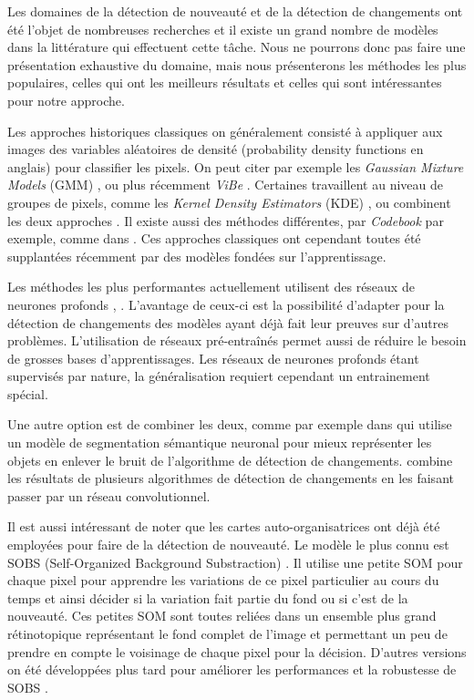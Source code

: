 	Les domaines de la détection de nouveauté et de la détection de changements ont été l'objet de nombreuses recherches et il existe un grand nombre de modèles dans la littérature qui effectuent cette tâche. Nous ne pourrons donc pas faire une présentation exhaustive du domaine, mais nous présenterons les méthodes les plus populaires, celles qui ont les meilleurs résultats et celles qui sont intéressantes pour notre approche.

	Les approches historiques classiques on généralement consisté à appliquer aux images des variables aléatoires de densité (probability density functions en anglais) pour classifier les pixels. On peut citer par exemple les \textit{Gaussian Mixture Models} (GMM) \cite{zivkovic2004improved}, ou plus récemment \textit{ViBe} \cite{barnich2009vibe}. Certaines travaillent au niveau de groupes de pixels, comme les \textit{Kernel Density Estimators} (KDE) \cite{elgammal2000non}, ou combinent les deux approches \cite{toyama1999wallflower}. Il existe aussi des méthodes différentes, par \textit{Codebook} par exemple, comme dans \cite{kim2004background}. Ces approches classiques ont cependant toutes été supplantées récemment par des modèles fondées sur l'apprentissage.

	Les méthodes les plus performantes actuellement utilisent des réseaux de neurones profonds \cite{tezcan2021bsuv}, \cite{bouwmans2019deep}. L'avantage de ceux-ci est la possibilité d'adapter pour la détection de changements des modèles ayant déjà fait leur preuves sur d'autres problèmes. L'utilisation de réseaux pré-entraînés permet aussi de réduire le besoin de grosses bases d'apprentissages. Les réseaux de neurones profonds étant supervisés par nature, la généralisation requiert cependant un entrainement spécial.

	Une autre option est de combiner les deux, comme par exemple dans \cite{braham2017semantic} qui utilise un modèle de segmentation sémantique neuronal pour mieux représenter les objets en enlever le bruit de l'algorithme de détection de changements. \cite{zeng2019combining} combine les résultats de plusieurs algorithmes de détection de changements en les faisant passer par un réseau convolutionnel.

	Il est aussi intéressant de noter que les cartes auto-organisatrices ont déjà été employées pour faire de la détection de nouveauté. Le modèle le plus connu est SOBS (Self-Organized Background Substraction) \cite{maddalena2008self}. Il utilise une petite SOM pour chaque pixel pour apprendre les variations de ce pixel particulier au cours du temps et ainsi décider si la variation fait partie du fond ou si c'est de la nouveauté. Ces petites SOM sont toutes reliées dans un ensemble plus grand rétinotopique représentant le fond complet de l'image et permettant un peu de prendre en compte le voisinage de chaque pixel pour la décision. D'autres versions on été développées plus tard pour améliorer les performances et la robustesse de SOBS \cite{gemignani2016robust}.

